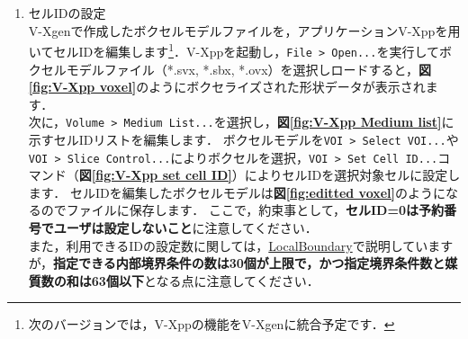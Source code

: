 \begin{enumerate}
\item セルIDの設定\\
V-Xgenで作成したボクセルモデルファイルを，アプリケーションV-Xppを用いてセルIDを編集します\footnote{次のバージョンでは，V-Xppの機能をV-Xgenに統合予定です．}．V-Xppを起動し，\verb|File > Open...|を実行してボクセルモデルファイル（*.svx, *.sbx, *.ovx）を選択しロードすると，\textbf{図\ref{fig:V-Xpp voxel}}のようにボクセライズされた形状データが表示されます．\\

 次に，\verb|Volume > Medium List...|を選択し，\textbf{図\ref{fig:V-Xpp Medium list}}に示すセルIDリストを編集します．
ボクセルモデルを\verb|VOI > Select VOI...|や\verb|VOI > Slice Control...|によりボクセルを選択，\verb|VOI > Set Cell ID...|コマンド（\textbf{図\ref{fig:V-Xpp set cell ID}}）によりセルIDを選択対象セルに設定します．
セルIDを編集したボクセルモデルは\textbf{図\ref{fig:editted voxel}}のようになるのでファイルに保存します．
ここで，約束事として，\textbf{セルID=0は予約番号でユーザは設定しないこと}に注意してください．\\

また，利用できるIDの設定数に関しては，\hyperlink{tgt:localboundary}{LocalBoundary}で説明していますが，\textbf{指定できる内部境界条件の数は30個が上限で，かつ指定境界条件数と媒質数の和は63個以下}となる点に注意してください．


\end{enumerate}
